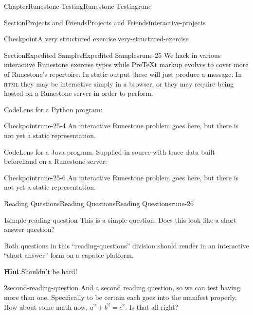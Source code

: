 \documentclass[oneside,10pt,]{book}
\newcommand{\blocktitlefont}{\relax}
\newcommand{\initialism}[1]{\textsc{\MakeLowercase{#1}}}
\numberwithin{equation}{section}
\begin{document}
\begin{chapterptx}{Chapter}{Runestone Testing}{}{Runestone Testing}{}{}{rune}
\begin{sectionptx}{Section}{Projects and Friends}{}{Projects and Friends}{}{}{interactive-projects}
\begin{inlineexercise}{Checkpoint}{A very structured exercise.}{very-structured-exercise}
\end{inlineexercise}%
\end{sectionptx}
%
%
\typeout{************************************************}
\typeout{************************************************}
%
\begin{sectionptx}{Section}{Expedited Samples}{}{Expedited Samples}{}{}{rune-25}
We hack in various interactive Runestone exercise types while PreTeXt markup evolves to cover more of Runestone's repertoire.  In static output these will just produce a message.  In \initialism{HTML} they may be interactive simply in a browser, or they may require being hosted on a Runestone server in order to perform.%
\par
CodeLens for a Python program:%
\begin{inlineexercise}{Checkpoint}{}{rune-25-4}%
An interactive Runestone problem goes here, but there is not yet a static representation.%
\end{inlineexercise}%
CodeLens for a Java program.  Supplied in source with trace data built beforehand on a Runestone server:%
\begin{inlineexercise}{Checkpoint}{}{rune-25-6}%
An interactive Runestone problem goes here, but there is not yet a static representation.%
\end{inlineexercise}%
\end{sectionptx}
%
%
\typeout{************************************************}
\typeout{************************************************}
%
\begin{reading-questions-section}{Reading Questions}{Reading Questions}{}{Reading Questions}{}{}{rune-26}
\begin{divisionexercise}{1}{}{}{simple-reading-question}%
This is a simple question.  Does this look like a short answer question?%
\par
Both questions in this ``reading-questions'' division should render in an interactive ``short answer'' form on a capable platform.%
\par\smallskip%
\noindent\textbf{\blocktitlefont Hint}.\hypertarget{simple-reading-question-2}{}\quad{}Shouldn't be hard!%
\end{divisionexercise}%
\begin{divisionexercise}{2}{}{}{second-reading-question}%
And a second reading question, so we can test having more than one.  Specifically to be certain each goes into the manifest properly.  How about some math now, \(a^2+b^2=c^2\).  Is that all right?%

\end{divisionexercise}
\end{reading-questions-section}
\end{chapterptx}
\end{document}

